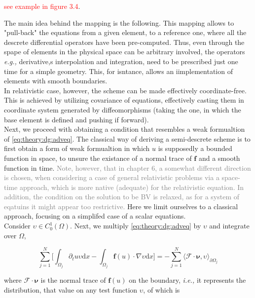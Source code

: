 \textcolor{red}{see example in figure 3.4}. 

The main idea behind the mapping is the following. This mapping allows to "pull-back" the equations from a given element, to a reference one, where all the descrete differential operators have been pre-computed. Thus, even through the spape of elements in the physical space can be arbitrary involved, the operators \textit{e.g.,} derivative,s interpolation and integration, need to be prescribed just one time for a simple geometry. This, for isntance, allows an iimplementation of elements with smooth boundaries. \\

In relativistic case, however, the scheme can be made effectively coordinate-free. This is achieved by utilizing covariance of equations, effectively casting them in coordinate system generated by diffeomorphisms (taking the one, in which the base element is defined and pushing if forward). \\


Next, we proceed with obtaining a condition that resembles a weak formualtion of \ref{eq:theory:dg:adveq}. The classical way of deriving a semi-descrete scheme is to first obtain a form of weak formualtion in which $u$ is supposedly a bounded function in space, to unsure the existance of a normal trace of $\boldsymbol{f}$ and a smooth function in time. \textcolor{gray}{Note, however, that in chapter 6, a somewhat different direction is chosen, when considering a case of general relativistic problems via a space-time approach, which is more native (adequate) for the relativistic equation. In addition, the condition on the solution to be BV is relaxed, as for a system of eqatuins it might appear too restrictive.} Here we limit ourselves to a classical approach, focusing on a simplifed case of a scalar equations. \\

Consider $\upsilon \in C_0 ^1(\Omega)$. Next, we multiply \ref{eq:theory:dg:adveq} by $\upsilon$ and integrate over $\Omega$, 

\begin{equation}
\sum_{j=1}^{N}\Bigg[\int_{\Omega_j}\partial_{t}u\upsilon\text{d}x - \int_{\Omega_j}\boldsymbol{f}(u)\cdot\nabla\upsilon\text{d}x\Bigg] = -\sum_{j=1}^{N}\langle\boldsymbol{\mathcal{F}}\cdot\boldsymbol{\nu},\upsilon\rangle_{\partial\Omega_j}
\label{eq:theory:dg:intformadveq}
\end{equation}

where $\boldsymbol{\mathcal{F}}\cdot\boldsymbol{\nu}$ is the normal trace of $\boldsymbol{f}(u)$ on the boundary, \textit{i.e.,} it represents the distribution, that value on any test function $\upsilon$, of which is 

